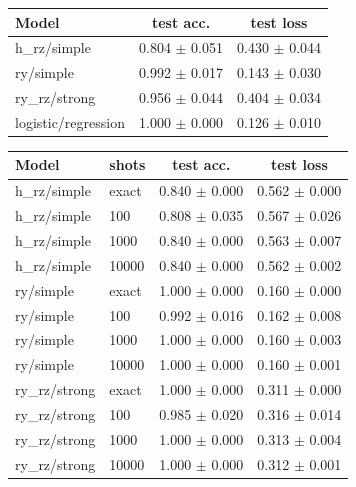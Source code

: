 
\begin{center}
\label{tab:repeated-seed}
\setlength{\tabcolsep}{3pt}
\begin{tabular}{@{}lcc@{}}
\toprule
Model & test acc. & test loss \\
\midrule
h\_rz/simple & 0.804 $\pm$ 0.051 & 0.430 $\pm$ 0.044 \\
ry/simple & 0.992 $\pm$ 0.017 & 0.143 $\pm$ 0.030 \\
ry\_rz/strong & 0.956 $\pm$ 0.044 & 0.404 $\pm$ 0.034 \\
logistic/regression & 1.000 $\pm$ 0.000 & 0.126 $\pm$ 0.010 \\
\bottomrule
\end{tabular}
\end{center}


\begin{center}
\label{tab:shot-noise}
\setlength{\tabcolsep}{2.5pt}
\begin{tabular}{@{}llcc@{}}
\toprule
Model & shots & test acc. & test loss \\
\midrule
h\_rz/simple & exact & 0.840 $\pm$ 0.000 & 0.562 $\pm$ 0.000 \\
h\_rz/simple & 100 & 0.808 $\pm$ 0.035 & 0.567 $\pm$ 0.026 \\
h\_rz/simple & 1000 & 0.840 $\pm$ 0.000 & 0.563 $\pm$ 0.007 \\
h\_rz/simple & 10000 & 0.840 $\pm$ 0.000 & 0.562 $\pm$ 0.002 \\
ry/simple & exact & 1.000 $\pm$ 0.000 & 0.160 $\pm$ 0.000 \\
ry/simple & 100 & 0.992 $\pm$ 0.016 & 0.162 $\pm$ 0.008 \\
ry/simple & 1000 & 1.000 $\pm$ 0.000 & 0.160 $\pm$ 0.003 \\
ry/simple & 10000 & 1.000 $\pm$ 0.000 & 0.160 $\pm$ 0.001 \\
ry\_rz/strong & exact & 1.000 $\pm$ 0.000 & 0.311 $\pm$ 0.000 \\
ry\_rz/strong & 100 & 0.985 $\pm$ 0.020 & 0.316 $\pm$ 0.014 \\
ry\_rz/strong & 1000 & 1.000 $\pm$ 0.000 & 0.313 $\pm$ 0.004 \\
ry\_rz/strong & 10000 & 1.000 $\pm$ 0.000 & 0.312 $\pm$ 0.001 \\
\bottomrule
\end{tabular}
\end{center}


